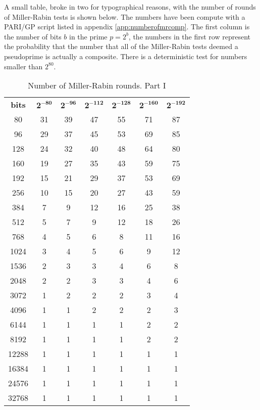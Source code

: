 \documentclass[synpaper]{book}
\begin{document}
A small table, broke in two for typographical reasons, with the number of rounds of Miller-Rabin tests is shown below. The numbers have been compute with a PARI/GP script listed in appendix \ref{app:numberofmrcomp}.
The first column is the number of bits $b$ in the prime $p = 2^b$, the numbers in the first row represent the
probability that the number that all of the Miller-Rabin tests deemed a pseudoprime is actually a composite. There is a deterministic test for numbers smaller than $2^{80}$.

\begin{table}[h]
\begin{center}
\begin{tabular}{c c c c c c c}
\textbf{bits} & $\mathbf{2^{-80}}$ & $\mathbf{2^{-96}}$ & $\mathbf{2^{-112}}$ & $\mathbf{2^{-128}}$ & $\mathbf{2^{-160}}$ & $\mathbf{2^{-192}}$ \\
80    & 31 & 39 & 47 & 55 & 71 & 87  \\
96    & 29 & 37 & 45 & 53 & 69 & 85  \\
128   & 24 & 32 & 40 & 48 & 64 & 80  \\
160   & 19 & 27 & 35 & 43 & 59 & 75  \\
192   & 15 & 21 & 29 & 37 & 53 & 69  \\
256   & 10 & 15 & 20 & 27 & 43 & 59  \\
384   & 7  & 9  & 12 & 16 & 25 & 38  \\
512   & 5  & 7  & 9  & 12 & 18 & 26  \\
768   & 4  & 5  & 6  & 8  & 11 & 16  \\
1024  & 3  & 4  & 5  & 6  & 9  & 12  \\
1536  & 2  & 3  & 3  & 4  & 6  & 8   \\
2048  & 2  & 2  & 3  & 3  & 4  & 6   \\
3072  & 1  & 2  & 2  & 2  & 3  & 4   \\
4096  & 1  & 1  & 2  & 2  & 2  & 3   \\
6144  & 1  & 1  & 1  & 1  & 2  & 2   \\
8192  & 1  & 1  & 1  & 1  & 2  & 2   \\
12288 & 1  & 1  & 1  & 1  & 1  & 1   \\
16384 & 1  & 1  & 1  & 1  & 1  & 1   \\
24576 & 1  & 1  & 1  & 1  & 1  & 1   \\
32768 & 1  & 1  & 1  & 1  & 1  & 1
\end{tabular}
\caption{ Number of Miller-Rabin rounds. Part I } \label{table:millerrabinrunsp1}
\end{center}
\end{table}
\end{document}

